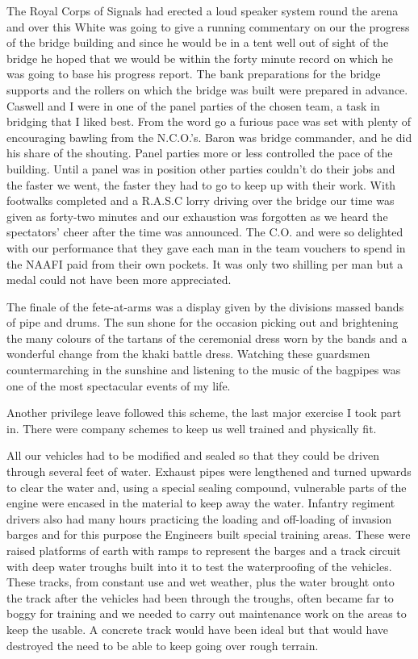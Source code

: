 The Royal Corps of Signals had erected a loud speaker system round the
arena and over this \captain White was going to give a running
commentary on our the progress of the bridge building and since he
would be in a tent well out of sight of the bridge he hoped that we
would be within the forty minute record on which he was going to base
his progress report. The bank preparations for the bridge supports and
the rollers on which the bridge was built were prepared in
advance. Caswell and I were in one of the panel parties of the chosen
team, a task in bridging that I liked best. From the word go a furious
pace was set with plenty of encouraging bawling from the N.C.O.'s. \Lieutenant
Baron was bridge commander, and he did his share of the
shouting. Panel parties more or less controlled the pace of the
building. Until a panel was in position other parties couldn't do
their jobs and the faster we went, the faster they had to go to keep up
with their work. With footwalks completed and a R.A.S.C lorry driving
over the bridge our time was given as forty-two minutes and our
exhaustion was forgotten as we heard the spectators' cheer after the
time was announced. The C.O. and \captain were so delighted with our
performance that they gave each man in the team vouchers to spend in
the NAAFI paid from their own pockets. It was only two shilling
per man but a medal could not have been more appreciated.

The finale of the fete-at-arms was a display given by the divisions
massed bands of pipe and drums. The sun shone for the occasion picking
out and brightening the many colours of the tartans of the ceremonial
dress worn by the bands and a wonderful change from the khaki battle
dress. Watching these guardsmen countermarching in the sunshine
and listening to the music of the bagpipes was one of the most
spectacular events of my life.

Another privilege leave followed this scheme, the last major exercise I
took part in. There were company schemes to keep us well trained and
physically fit.

All our vehicles had to be modified and sealed so that they could be
driven through several feet of water. Exhaust pipes were lengthened
and turned upwards to clear the water and, using a special sealing
compound, vulnerable parts of the engine were encased in the material
to keep away the water. Infantry regiment drivers also had many hours
practicing the loading and off-loading of invasion barges and for
this purpose the Engineers built special training areas. These were
raised platforms of earth with ramps to represent the barges and a
track circuit with deep water troughs built into it to test the
waterproofing of the vehicles. These tracks, from constant use and
wet weather, plus the water brought onto the track after the vehicles
had been through the troughs, often became far to boggy for training
and we needed to carry out maintenance work on the areas to keep the
usable. A concrete track would have been ideal but that would have
destroyed the need to be able to keep going over rough terrain.

